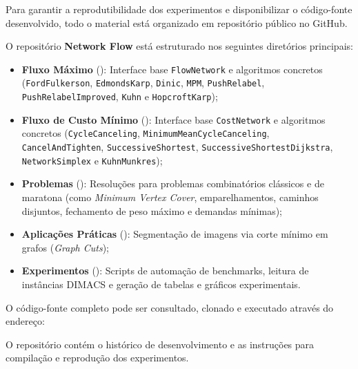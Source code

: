\documentclass[12pt,a4paper]{article}
\begin{document}
Para garantir a reprodutibilidade dos experimentos e disponibilizar o código-fonte desenvolvido, todo o material está organizado em repositório público no GitHub.

O repositório \textbf{Network Flow} está estruturado nos seguintes diretórios principais:
\begin{itemize}[leftmargin=1.5em, itemsep=0.2em]
\raggedright
    \item \textbf{Fluxo Máximo} (): Interface base \lstinline{FlowNetwork} e algoritmos concretos (\lstinline{FordFulkerson}, \lstinline{EdmondsKarp}, \lstinline{Dinic}, \lstinline{MPM}, \lstinline{PushRelabel}, \lstinline{PushRelabelImproved}, \lstinline{Kuhn} e \lstinline{HopcroftKarp});
    \item \textbf{Fluxo de Custo Mínimo} (): Interface base \lstinline{CostNetwork} e algoritmos concretos (\lstinline{CycleCanceling}, \lstinline{MinimumMeanCycleCanceling}, \lstinline{CancelAndTighten}, \lstinline{SuccessiveShortest}, \lstinline{SuccessiveShortestDijkstra}, \lstinline{NetworkSimplex} e \lstinline{KuhnMunkres});
    \item \textbf{Problemas} (): Resoluções para problemas combinatórios clássicos e de maratona (como \textit{Minimum Vertex Cover}, emparelhamentos, caminhos disjuntos, fechamento de peso máximo e demandas mínimas);
    \item \textbf{Aplicações Práticas} (): Segmentação de imagens via corte mínimo em grafos (\textit{Graph Cuts});
    \item \textbf{Experimentos} (): Scripts de automação de benchmarks, leitura de instâncias DIMACS e geração de tabelas e gráficos experimentais.
\end{itemize}

O código-fonte completo pode ser consultado, clonado e executado através do endereço:

\vspace{0.4cm}
\begin{center}
\end{center}
\vspace{0.4cm}

O repositório contém o histórico de desenvolvimento e as instruções para compilação e reprodução dos experimentos.
\end{document}
